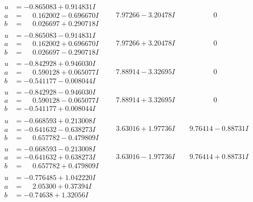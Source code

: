 \documentclass[1p]{elsarticle_modified}
\theoremstyle{definition}
\begin{document}
$$\begin{array}{c|c|c}
\begin{aligned}
u &= -0.865083 + 0.914831 I \\
a &= \phantom{-}0.162002 - 0.696670 I \\
b &= \phantom{-}0.026697 + 0.290718 I\end{aligned}
 & \phantom{-}7.97266 - 3.20478 I & \phantom{-0.000000 } 0 \\ \hline\begin{aligned}
u &= -0.865083 - 0.914831 I \\
a &= \phantom{-}0.162002 + 0.696670 I \\
b &= \phantom{-}0.026697 - 0.290718 I\end{aligned}
 & \phantom{-}7.97266 + 3.20478 I & \phantom{-0.000000 } 0 \\ \hline\begin{aligned}
u &= -0.842928 + 0.946030 I \\
a &= \phantom{-}0.590128 + 0.065077 I \\
b &= -0.541177 - 0.008044 I\end{aligned}
 & \phantom{-}7.88914 - 3.32695 I & \phantom{-0.000000 } 0 \\ \hline\begin{aligned}
u &= -0.842928 - 0.946030 I \\
a &= \phantom{-}0.590128 - 0.065077 I \\
b &= -0.541177 + 0.008044 I\end{aligned}
 & \phantom{-}7.88914 + 3.32695 I & \phantom{-0.000000 } 0 \\ \hline\begin{aligned}
u &= -0.668593 + 0.213008 I \\
a &= -0.641632 - 0.638273 I \\
b &= \phantom{-}0.657782 - 0.479809 I\end{aligned}
 & \phantom{-}3.63016 + 1.97736 I & \phantom{-}9.76414 - 0.88731 I \\ \hline\begin{aligned}
u &= -0.668593 - 0.213008 I \\
a &= -0.641632 + 0.638273 I \\
b &= \phantom{-}0.657782 + 0.479809 I\end{aligned}
 & \phantom{-}3.63016 - 1.97736 I & \phantom{-}9.76414 + 0.88731 I \\ \hline\begin{aligned}
u &= -0.776485 + 1.042220 I \\
a &= \phantom{-}2.05300 + 0.37394 I \\
b &= -0.74638 + 1.32056 I\end{aligned}

\end{array}$$
\end{document}
